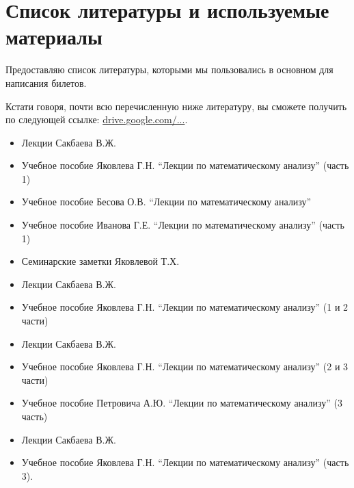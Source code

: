 \chapter{Список литературы и используемые материалы}

Предоставляю список литературы, которыми мы пользовались в основном для написания билетов. 

Кстати говоря, почти всю перечисленную ниже литературу, вы сможете получить по следующей ссылке: \href{https://drive.google.com/drive/u/0/folders/0BzuzEyNkpwYDcENXcV9jNWdwVlU}{drive.google.com/...}.


\begin{itemize}[wide,  labelwidth=!, noitemsep, label=$\blacktriangleright$, labelindent = 0pt]
\item
Лекции Сакбаева В.Ж.
\item
Учебное пособие Яковлева Г.Н. ``Лекции по математическому анализу'' (часть 1)
\item
Учебное пособие Бесова О.В. ``Лекции по математическому анализу''
\item
Учебное пособие Иванова Г.Е. ``Лекции по математическому анализу'' (часть 1)
\item
Семинарские заметки Яковлевой Т.Х.
\end{itemize}

\begin{itemize}[wide,  labelwidth=!, noitemsep, label=$\blacktriangleright$, labelindent = 0pt]
\item
Лекции Сакбаева В.Ж.
\item
Учебное пособие Яковлева Г.Н. ``Лекции по математическому анализу'' (1 и 2 части)
\end{itemize}

\begin{itemize}[wide,  labelwidth=!, noitemsep, label=$\blacktriangleright$, labelindent = 0pt]
\item
Лекции Сакбаева В.Ж.
\item
Учебное пособие Яковлева Г.Н. ``Лекции по математическому анализу'' (2 и 3 части)
\item
Учебное пособие Петровича А.Ю. ``Лекции по математическому анализу'' (3 часть)
\end{itemize}

\begin{itemize}[wide,  labelwidth=!, noitemsep, label=$\blacktriangleright$, labelindent = 0pt]
\item
Лекции Сакбаева В.Ж.
\item
Учебное пособие Яковлева Г.Н. ``Лекции по математическому анализу''  (часть 3).
\end{itemize}

